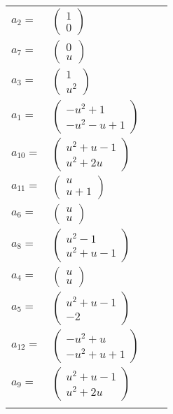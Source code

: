 \documentclass[1p]{elsarticle_modified}
\theoremstyle{definition}
\begin{document}
\begin{tabular}{m{7pt} m{180pt} m{7pt} m{180pt} }
\flushright $a_{2}=$&$\begin{pmatrix}1\\0\end{pmatrix}$ \\
\flushright $a_{7}=$&$\begin{pmatrix}0\\u\end{pmatrix}$ \\
\flushright $a_{3}=$&$\begin{pmatrix}1\\u^2\end{pmatrix}$ \\
\flushright $a_{1}=$&$\begin{pmatrix}- u^2+1\\- u^2- u+1\end{pmatrix}$ \\
\flushright $a_{10}=$&$\begin{pmatrix}u^2+u-1\\u^2+2 u\end{pmatrix}$ \\
\flushright $a_{11}=$&$\begin{pmatrix}u\\u+1\end{pmatrix}$ \\
\flushright $a_{6}=$&$\begin{pmatrix}u\\u\end{pmatrix}$ \\
\flushright $a_{8}=$&$\begin{pmatrix}u^2-1\\u^2+u-1\end{pmatrix}$ \\
\flushright $a_{4}=$&$\begin{pmatrix}u\\u\end{pmatrix}$ \\
\flushright $a_{5}=$&$\begin{pmatrix}u^2+u-1\\-2\end{pmatrix}$ \\
\flushright $a_{12}=$&$\begin{pmatrix}- u^2+u\\- u^2+u+1\end{pmatrix}$ \\
\flushright $a_{9}=$&$\begin{pmatrix}u^2+u-1\\u^2+2 u\end{pmatrix}$\\&\end{tabular}
\end{document}
